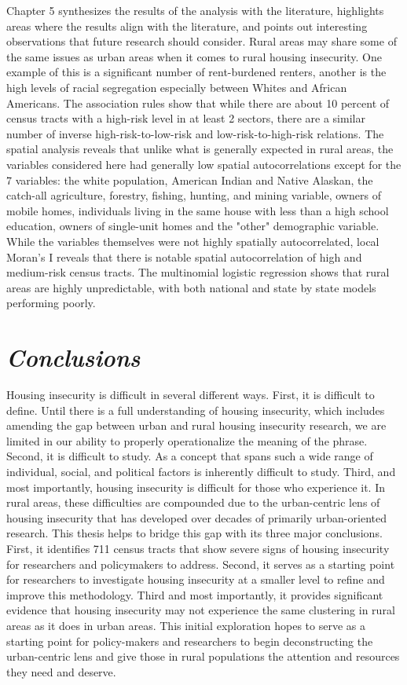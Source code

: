 Chapter 5 synthesizes the results of the analysis with the literature, highlights areas where the results align with the literature, and points out interesting observations that future research should consider. Rural areas may share some of the same issues as urban areas when it comes to rural housing insecurity. One example of this is a significant number of rent-burdened renters, another is the high levels of racial segregation especially between Whites and African Americans. The association rules show that while there are about 10 percent of census tracts with a high-risk level in at least 2 sectors, there are a similar number of inverse high-risk-to-low-risk and low-risk-to-high-risk relations. The spatial analysis reveals that unlike what is generally expected in rural areas, the variables considered here had generally low spatial autocorrelations except for the 7 variables: the white population, American Indian and Native Alaskan, the catch-all agriculture, forestry, fishing, hunting, and mining variable, owners of mobile homes, individuals living in the same house with less than a high school education, owners of single-unit homes and the "other" demographic variable. While the variables themselves were not highly spatially autocorrelated, local Moran's I reveals that there is notable spatial autocorrelation of high and medium-risk census tracts. The multinomial logistic regression shows that rural areas are highly unpredictable, with both national and state by state models performing poorly. 


\section{\textit{Conclusions}}

Housing insecurity is difficult in several different ways. First, it is difficult to define. Until there is a full understanding of housing insecurity, which includes amending the gap between urban and rural housing insecurity research, we are limited in our ability to properly operationalize the meaning of the phrase. Second, it is difficult to study. As a concept that spans such a wide range of individual, social, and political factors is inherently difficult to study. Third, and most importantly, housing insecurity is difficult for those who experience it. In rural areas, these difficulties are compounded due to the urban-centric lens of housing insecurity that has developed over decades of primarily urban-oriented research. This thesis helps to bridge this gap with its three major conclusions. First, it identifies 711 census tracts that show severe signs of housing insecurity for researchers and policymakers to address. Second, it serves as a starting point for researchers to investigate housing insecurity at a smaller level to refine and improve this methodology. Third and most importantly, it provides significant evidence that housing insecurity may not experience the same clustering in rural areas as it does in urban areas. This initial exploration hopes to serve as a starting point for policy-makers and researchers to begin deconstructing the urban-centric lens and give those in rural populations the attention and resources they need and deserve. 

